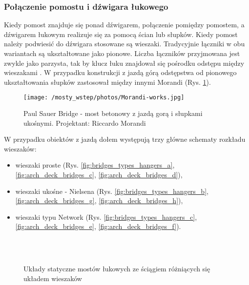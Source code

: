 \subsubsection{Połączenie pomostu i dźwigara łukowego}
Kiedy pomost znajduje się ponad dźwigarem, połączenie pomiędzy pomostem, a dźwigarem łukowym realizuje się za pomocą ścian lub słupków. Kiedy pomost należy podwiesić do dźwigara stosowane są wieszaki. Tradycyjnie łączniki w obu wariantach są ukształtowane jako pionowe. Liczba łączników przyjmowana jest zwykle jako parzysta, tak by klucz łuku znajdował się pośrodku odstępu między wieszakami \parencite{Szczygie1978}. W przypadku konstrukcji z jazdą górą odstępstwa od pionowego ukształtowania słupków zastosował między innymi Morandi (Rys. \ref{fig:bridges_morandi}). 

\begin{figure}[hbt!]
	\centering
	\texttt{[image: /mosty\_wstep/photos/Morandi-works.jpg]}
	\captionsetup{justification=centering}
	\caption{Paul Sauer Bridge - most betonowy z jazdą gorą i słupkami ukośnymi. Projektant: Riccardo Morandi \parencite{Morandi1962}}
	\label{fig:bridges_morandi}
\end{figure}

W przypadku obiektów z jazdą dołem występują trzy główne schematy rozkładu wieszaków:
\begin{itemize}
	\item wieszaki proste (Rys. \ref{fig:bridges_types_hangers_a}, \ref{fig:arch_deck_bridges_c}, \ref{fig:arch_deck_bridges_d}),
	\item wieszaki ukośne - Nielsena (Rys. \ref{fig:bridges_types_hangers_b}, \ref{fig:arch_deck_bridges_g},  \ref{fig:arch_deck_bridges_h}),
	\item wieszaki typu Network (Rys. \ref{fig:bridges_types_hangers_c}, \ref{fig:arch_deck_bridges_e}, \ref{fig:arch_deck_bridges_f}).
\end{itemize}

\begin{figure}[h]
	\centering
	  \\
	 \\
	\captionsetup{justification=centering}
	\caption{Układy statyczne mostów łukowych ze ściągiem różniących się układem wieszaków}
	\label{fig:bridges_types_hangers}
\end{figure}

